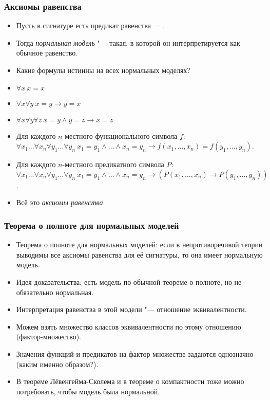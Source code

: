 \documentclass[10pt]{beamer}
\begin{document}
\begin{frame}
    \frametitle{Аксиомы равенства}
    \begin{itemize}
        \item Пусть в сигнатуре есть предикат равенства $=$.
        \item Тогда \emph{нормальная модель} "--- такая, в которой он интерпретируется как обычное равенство. 
        \item Какие формулы истинны на всех нормальных моделях?
        \pause
        \item $\forall x ~ x=x$
        \item $\forall x \forall y ~ x=y \to y=x$
        \item $\forall x \forall y \forall z ~ x=y \land y=z \to x=z$
        \pause
        \item Для каждого $n$-местного функционального символа $f$: \pause $\forall x_1 \ldots \forall x_n \forall y_1 \ldots \forall y_n ~ x_1 = y_1 \land \ldots \land x_n = y_n \to f(x_1,\ldots,x_n) = f(y_1,\ldots,y_n)$.
        \pause
        \item Для каждого $n$-местного предикатного символа $P$: \pause $\forall x_1 \ldots \forall x_n \forall y_1 \ldots \forall y_n ~ x_1 = y_1 \land \ldots \land x_n = y_n \to (P(x_1,\ldots,x_n) \to P(y_1,\ldots,y_n))$.
        \pause
        \item Всё это \emph{аксиомы равенства}.
    \end{itemize}
\end{frame}

\begin{frame}
    \frametitle{Теорема о полноте для нормальных моделей}
    \begin{itemize}
        \item Теорема о полноте для нормальных моделей: если в непротиворечивой теории выводимы все аксиомы равенства для её сигнатуры, то она имеет нормальную модель.
        \item Идея доказательства: есть модель по обычной теореме о полноте, но не обязательно нормальная. 
        \item Интерпретация равенства в этой модели "--- \pause отношение эквивалентности. 
        \item Можем взять множество классов эквивалентности по этому отношению (фактор-множество). 
        \item Значения функций и предикатов на фактор-множестве задаются однозначно \pause (каким именно образом?).
        \item В теореме Лёвенгейма-Сколема и в теореме о компактности тоже можно потребовать, чтобы модель была нормальной.
    \end{itemize}
\end{frame}
\end{document}
